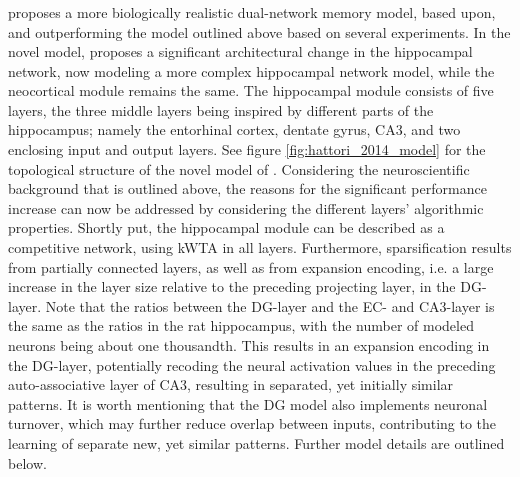 \subsubsection{\cite{Hattori2014}}
\cite{Hattori2014} proposes a more biologically realistic dual-network memory model, based upon, and outperforming the model outlined above based on several experiments. In the novel model, \cite{Hattori2014} proposes a significant architectural change in the hippocampal network, now modeling a more complex hippocampal network model, while the neocortical module remains the same. The hippocampal module consists of five layers, the three middle layers being inspired by different parts of the hippocampus; namely the entorhinal cortex, dentate gyrus, CA3, and two enclosing input and output layers. See figure \ref{fig:hattori_2014_model} for the topological structure of the novel model of \cite{Hattori2014}. 
Considering the neuroscientific background that is outlined above, the reasons for the significant performance increase can now be addressed by considering the different layers' algorithmic properties. 
Shortly put, the hippocampal module can be described as a competitive network, using kWTA in all layers. Furthermore, sparsification results from partially connected layers, as well as from expansion encoding, i.e. a large increase in the layer size relative to the preceding projecting layer, in the DG-layer. Note that the ratios between the DG-layer and the EC- and CA3-layer is the same as the ratios in the rat hippocampus, with the number of modeled neurons being about one thousandth. This results in an expansion encoding in the DG-layer, potentially recoding the neural activation values in the preceding auto-associative layer of CA3, resulting in separated, yet initially similar patterns. It is worth mentioning that the DG model also implements neuronal turnover, which may further reduce overlap between inputs, contributing to the learning of separate new, yet similar patterns. Further model details are outlined below.


